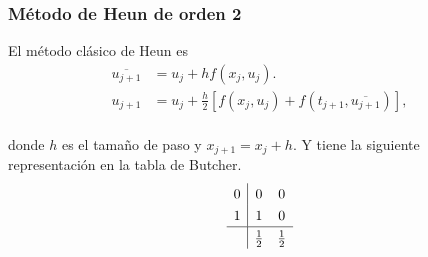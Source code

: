 \begin{frame}
  \frametitle{Método de Heun de orden 2}
  El método clásico de Heun es
  \begin{align*}
    \overline{u_{j+1}} & = u_{j} + hf\left(x_{j},u_{j}\right).                                                               \\
    u_{j+1}            & = u_{j}+\frac{h}{2}\left[f\left(x_{j},u_{j}\right)+f\left(t_{j+1},\overline{u_{j+1}}\right)\right], \\
  \end{align*}

  donde $h$ es el tamaño de paso y $x_{j+1}=x_{j}+h$.
  Y tiene la siguiente representación en la tabla de Butcher.
  \begin{equation*}
    \renewcommand\arraystretch{1.3}
    \begin{array}
      {c|cc}
      0 & 0           & 0           \\
      1 & 1           & 0           \\
      \hline
        & \frac{1}{2} & \frac{1}{2}
    \end{array}
  \end{equation*}
\end{frame}